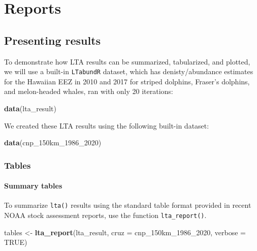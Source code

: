 \documentclass[
]{book}
\newenvironment{Shaded}{\begin{snugshade}}{\end{snugshade}}
\newcommand{\DataTypeTok}[1]{\textcolor[rgb]{0.13,0.29,0.53}{#1}}
\newcommand{\DecValTok}[1]{\textcolor[rgb]{0.00,0.00,0.81}{#1}}
\newcommand{\KeywordTok}[1]{\textcolor[rgb]{0.13,0.29,0.53}{\textbf{#1}}}
\newcommand{\NormalTok}[1]{#1}
\newcommand{\OtherTok}[1]{\textcolor[rgb]{0.56,0.35,0.01}{#1}}
\newcommand{\StringTok}[1]{\textcolor[rgb]{0.31,0.60,0.02}{#1}}
\begin{document}
\hypertarget{part-reports}{%
\part{Reports}\label{part-reports}}

\hypertarget{presenting-results}{%
\chapter{Presenting results}\label{presenting-results}}

To demonstrate how LTA results can be summarized, tabularized, and plotted, we will use a built-in \texttt{LTabundR} dataset, which has denisty/abundance estimates for the Hawaiian EEZ in 2010 and 2017 for striped dolphins, Fraser's dolphins, and melon-headed whales, ran with only 20 iterations:

\begin{Shaded}
\begin{Highlighting}[]
\KeywordTok{data}\NormalTok{(lta_result)}
\end{Highlighting}
\end{Shaded}

We created these LTA results using the following built-in dataset:

\begin{Shaded}
\begin{Highlighting}[]
\KeywordTok{data}\NormalTok{(cnp_150km_}\DecValTok{1986}\NormalTok{_}\DecValTok{2020}\NormalTok{)}
\end{Highlighting}
\end{Shaded}

\hypertarget{tables}{%
\section*{Tables}\label{tables}}

\hypertarget{summary-tables}{%
\subsection*{Summary tables}\label{summary-tables}}

To summarize \texttt{lta()} results using the standard table format provided in recent NOAA stock assessment reports, use the function \texttt{lta\_report()}.

\begin{Shaded}
\begin{Highlighting}[]
\NormalTok{tables <-}\StringTok{ }\KeywordTok{lta_report}\NormalTok{(lta_result, }
                     \DataTypeTok{cruz =}\NormalTok{ cnp_150km_}\DecValTok{1986}\NormalTok{_}\DecValTok{2020}\NormalTok{,}
                     \DataTypeTok{verbose =} \OtherTok{TRUE}\NormalTok{)}
\end{Highlighting}
\end{Shaded}
\end{document}
